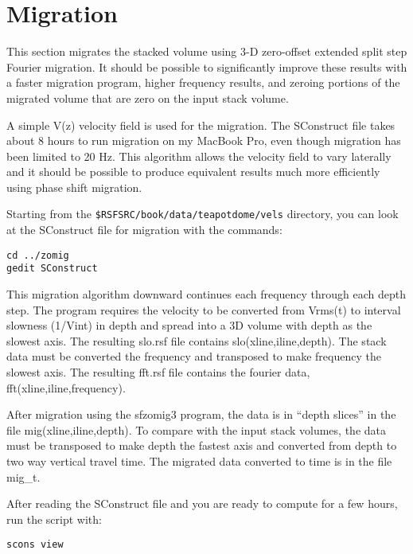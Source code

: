 

\section{Migration}

This section migrates the stacked volume using 3-D zero-offset extended split step Fourier migration.  It should be possible to significantly improve these results with a faster migration program, higher frequency results, and zeroing portions of the migrated volume that are zero on the input stack volume.

A simple V(z) velocity field is used for the migration.  The SConstruct file takes about 8 hours to run migration on my MacBook Pro, even though migration has been limited to 20 Hz.   This algorithm allows the velocity field to vary laterally and it should be possible to produce equivalent results much more efficiently using phase shift migration.
 
Starting from the \texttt{\$RSFSRC/book/data/teapotdome/vels} directory, you can look at the SConstruct file for migration with the commands:
\begin{verbatim}  
cd ../zomig
gedit SConstruct
\end{verbatim}  

This migration algorithm downward continues each frequency through each depth step.  The program requires the velocity to be converted from Vrms(t) to interval slowness (1/Vint) in depth and spread into a 3D volume with depth as the slowest axis.  The resulting slo.rsf file contains slo(xline,iline,depth).  The stack data must be converted the frequency and transposed to make frequency the slowest axis.  The resulting fft.rsf file contains the fourier data, fft(xline,iline,frequency).  
 
After migration using the sfzomig3 program, the data is in “depth slices” in the file mig(xline,iline,depth).  To compare with the input stack volumes, the data must be transposed to make depth the fastest axis and converted from depth to two way vertical travel time.  The migrated data converted to time is in the file mig\_t.

After reading the SConstruct file and you are ready to compute for a few hours, run the script with:
\begin{verbatim}  
scons view
\end{verbatim}  

